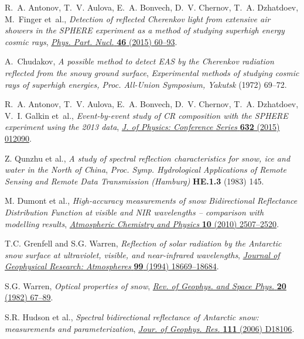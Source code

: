 \documentclass[a4paper,11pt]{article}
\begin{document}
\begin{thebibliography}{10}

R.~A. Antonov, T.~V. Aulova, E.~A. Bonvech, D.~V. Chernov, T.~A. Dzhatdoev, M.~Finger et~al., \emph{Detection of reflected Cherenkov light from extensive air showers in the SPHERE experiment as a method of studying superhigh energy cosmic rays}, \href{http://dx.doi.org/10.1134/S1063779615010025}{\emph{Phys. Part. Nucl.} {\bfseries 46} (2015) 60--93}.

A.~Chudakov, \emph{{A possible method to detect EAS by the Cherenkov radiation reflected from the snowy ground surface}}, {\emph{{Experimental methods of studying cosmic rays of superhigh energies, Proc. All-Union Symposium, Yakutsk}} (1972) 69--72}.

R.~A. Antonov, T.~V. Aulova, E.~A. Bonvech, D.~V. Chernov, T.~A. Dzhatdoev, V.~I. Galkin et~al., \emph{{Event-by-event study of CR composition with the SPHERE experiment using the 2013 data}}, \href{http://dx.doi.org/10.1088/1742-6596/632/1/012090}{\emph{J. of Physics: Conference Series} {\bfseries 632} (2015) 012090}.

{Z. Qunzhu et al.}, \emph{{A study of spectral reflection characteristics for snow, ice and water in the North of China}}, {\emph{{Proc. Symp. Hydrological Applications of Remote Sensing and Remote Data Transmission (Hamburg)}} {\bfseries HE.1.3} (1983) 145}.

{M. Dumont et al.}, \emph{{High-accuracy measurements of snow Bidirectional Reflectance Distribution Function at visible and NIR wavelengths -- comparison with modelling results}}, \href{http://dx.doi.org/10.5194/acp-10-2507-2010}{\emph{Atmospheric Chemistry and Physics} {\bfseries 10} (2010) 2507--2520}.

{T.C. Grenfell and S.G. Warren}, \emph{{Reflection of solar radiation by the Antarctic snow surface at ultraviolet, visible, and near-infrared wavelengths}}, \href{http://dx.doi.org/10.1029/94JD01484}{\emph{Journal of Geophysical Research: Atmospheres} {\bfseries 99} (1994) 18669--18684}.

{S.G. Warren}, \emph{{Optical properties of snow}}, \href{http://dx.doi.org/10.1029/RG020i001p00067}{\emph{Rev. of Geophys. and Space Phys.} {\bfseries 20} (1982) 67--89}.

{S.R. Hudson et al.}, \emph{Spectral bidirectional reflectance of Antarctic snow: measurements and parameterization}, \href{http://dx.doi.org/10.1029/2006JD007290}{\emph{Jour. of Geophys. Res.} {\bfseries 111} (2006) D18106}.


\end{thebibliography}
\end{document}
